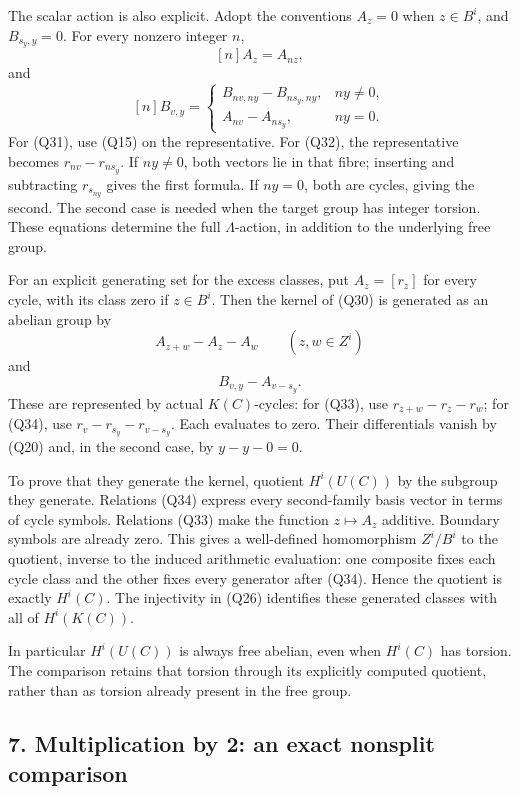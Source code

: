 \documentclass[
]{article}
\begin{document}
The scalar action is also explicit. Adopt the conventions \(A_z=0\) when
\(z\in B^i\), and \(B_{s_y,y}=0\). For every nonzero integer \(n\), \[
[n]A_z=A_{nz},
\tag{Q31}
\] and \[
[n]B_{v,y}=
\begin{cases}
B_{nv,ny}-B_{ns_y,ny},&ny\ne0,\\
A_{nv}-A_{ns_y},&ny=0.
\end{cases}
\tag{Q32}
\] For (Q31), use (Q15) on the representative. For (Q32), the
representative becomes \(r_{nv}-r_{ns_y}\). If \(ny\ne0\), both vectors
lie in that fibre; inserting and subtracting \(r_{s_{ny}}\) gives the
first formula. If \(ny=0\), both are cycles, giving the second. The
second case is needed when the target group has integer torsion. These
equations determine the full \(\Lambda\)-action, in addition to the
underlying free group.

For an explicit generating set for the excess classes, put \(A_z=[r_z]\)
for every cycle, with its class zero if \(z\in B^i\). Then the kernel of
(Q30) is generated as an abelian group by \[
A_{z+w}-A_z-A_w\qquad(z,w\in Z^i)
\tag{Q33}
\] and \[
B_{v,y}-A_{v-s_y}.
\tag{Q34}
\] These are represented by actual \(K(C)\)-cycles: for (Q33), use
\(r_{z+w}-r_z-r_w\); for (Q34), use \(r_v-r_{s_y}-r_{v-s_y}\). Each
evaluates to zero. Their differentials vanish by (Q20) and, in the
second case, by \(y-y-0=0\).

To prove that they generate the kernel, quotient \(H^i(U(C))\) by the
subgroup they generate. Relations (Q34) express every second-family
basis vector in terms of cycle symbols. Relations (Q33) make the
function \(z\mapsto A_z\) additive. Boundary symbols are already zero.
This gives a well-defined homomorphism \(Z^i/B^i\) to the quotient,
inverse to the induced arithmetic evaluation: one composite fixes each
cycle class and the other fixes every generator after (Q34). Hence the
quotient is exactly \(H^i(C)\). The injectivity in (Q26) identifies
these generated classes with all of \(H^i(K(C))\).

In particular \(H^i(U(C))\) is always free abelian, even when \(H^i(C)\)
has torsion. The comparison retains that torsion through its explicitly
computed quotient, rather than as torsion already present in the free
group.

\subsection{7. Multiplication by 2: an exact nonsplit
comparison}\label{multiplication-by-2-an-exact-nonsplit-comparison}
\end{document}
